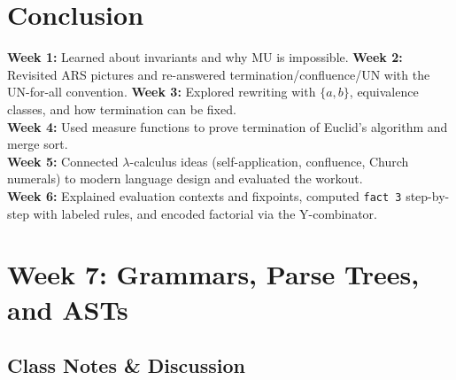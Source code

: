 \documentclass{article}
\theoremstyle{theorem}
\theoremstyle{definition}
\theoremstyle{remark}
\begin{document}
\section{Conclusion}
\textbf{Week 1:} Learned about invariants and why MU is impossible.  
\textbf{Week 2:} Revisited ARS pictures and re-answered termination/confluence/UN with the UN-for-all convention.  
\textbf{Week 3:} Explored rewriting with $\{a,b\}$, equivalence classes, and how termination can be fixed.\\
\textbf{Week 4:} Used measure functions to prove termination of Euclid's algorithm and merge sort.\\
\textbf{Week 5:} Connected $\lambda$-calculus ideas (self-application, confluence, Church numerals) to modern language design and evaluated the workout.\\
\textbf{Week 6:} Explained evaluation contexts and fixpoints, computed \texttt{fact 3} step-by-step with labeled rules, and encoded factorial via the Y-combinator.
\section{Week 7: Grammars, Parse Trees, and ASTs}

\subsection{Class Notes \& Discussion}
\end{document}
